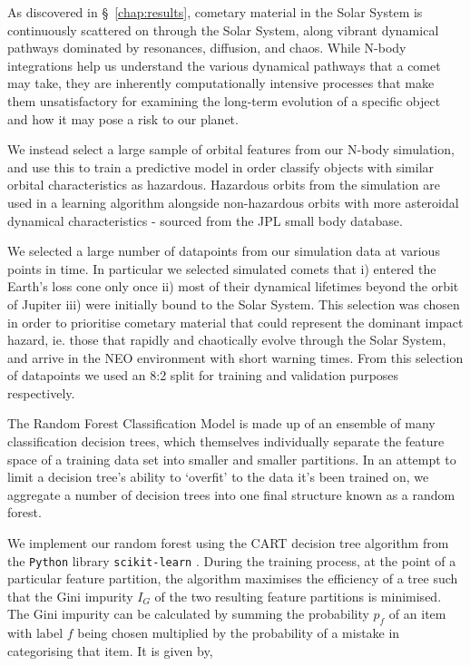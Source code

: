 As discovered in \S~\ref{chap:results}, cometary material in the Solar System is continuously scattered on through the Solar System, along vibrant dynamical pathways dominated by resonances, diffusion, and chaos. While N-body integrations help us understand the various dynamical pathways that a comet may take, they are inherently computationally intensive processes that make them unsatisfactory for examining the long-term evolution of a specific object and how it may pose a risk to our planet.

We instead select a large sample of orbital features from our N-body simulation, and use this to train a predictive model in order classify objects with similar orbital characteristics as hazardous. Hazardous orbits from the simulation are used in a learning algorithm alongside non-hazardous orbits with more asteroidal dynamical characteristics - sourced from the JPL small body database.

We selected a large number of datapoints from our simulation data at various points in time. In particular we selected simulated comets that i) entered the Earth's loss cone only once ii) most of their dynamical lifetimes beyond the orbit of Jupiter iii) were initially bound to the Solar System. This selection was chosen in order to prioritise cometary material that could represent the dominant impact hazard, ie. those that rapidly and chaotically evolve through the Solar System, and arrive in the NEO environment with short warning times. From this selection of datapoints we used an 8:2 split for training and validation purposes respectively.

The Random Forest Classification Model is made up of an ensemble of many classification decision trees, which themselves individually separate the feature space of a training data set into smaller and smaller partitions. In an attempt to limit a decision tree's ability to `overfit' to the data it's been trained on, we aggregate a number of decision trees into one final structure known as a random forest. 

We implement our random forest using the \textsc{CART} decision tree algorithm \citep{breiman2017classification} from the \texttt{Python} library \texttt{scikit-learn} \citep{cournapeau2015sci}. During the training process, at the point of a particular feature partition, the algorithm maximises the efficiency of a tree such that the Gini impurity $I_G$ of the two resulting feature partitions is minimised. The Gini impurity can be calculated by summing the probability $p_f$ of an item with label $f$  being chosen multiplied by the probability of a mistake in categorising that item.  It is given by,

